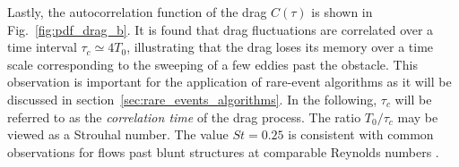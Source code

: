 Lastly, the autocorrelation function of the drag $C(\tau)$ is shown in Fig.~\ref{fig:pdf_drag_b}.
It is found that drag fluctuations are correlated over a time interval $\tau_c \simeq 4T_0$, illustrating that the drag loses its memory over a time scale corresponding to the sweeping of a few eddies past the obstacle.
%
This observation is important for the application of rare-event algorithms as it will be discussed in section~\ref{sec:rare_events_algorithms}.
%
In the following, $\tau_c$ will be referred to as the \textit{correlation time} of the drag process.
The ratio $T_0 / \tau_c$ may be viewed as a Strouhal number.
The value $St=0.25$ is consistent with common observations for flows past blunt structures at comparable Reynolds numbers \citep{rodi1998}.

